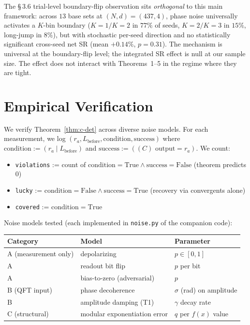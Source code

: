 \documentclass[11pt]{article}
\begin{document}
The \S\,3.6 trial-level boundary-flip observation sits \emph{orthogonal} to this main framework: across $13$ base sets at $(N, d) = (437, 4)$, phase noise universally activates a $K$-bin boundary ($K{=}1/K{=}2$ in $77\%$ of seeds, $K{=}2/K{=}3$ in $15\%$, long-jump in $8\%$), but with stochastic per-seed direction and no statistically significant cross-seed net SR (mean $+0.14\%$, $p{=}0.31$). The mechanism is universal at the boundary-flip level; the integrated SR effect is null at our sample size. The effect does not interact with Theorems~1--5 in the regime where they are tight.

\section{Empirical Verification}
\label{sec:empirical}

We verify Theorem~\ref{thm:c-det} across diverse noise models. For each measurement, we log $(r_a, L_{\mathrm{before}}, \mathrm{condition}, \mathrm{success})$ where $\mathrm{condition} := (r_a \mid L_{\mathrm{before}})$ and $\mathrm{success} := ((C) \text{ output} = r_a)$. We count:
\begin{itemize}
  \item \texttt{violations} := count of $\mathrm{condition} = \text{True} \land \mathrm{success} = \text{False}$ (theorem predicts $0$)
  \item \texttt{lucky} := $\mathrm{condition} = \text{False} \land \mathrm{success} = \text{True}$ (recovery via convergents alone)
  \item \texttt{covered} := $\mathrm{condition} = \text{True}$
\end{itemize}

Noise models tested (each implemented in \texttt{noise.py} of the companion code):

\begin{center}
\begin{tabular}{lll}
\toprule
Category & Model & Parameter \\
\midrule
A (measurement only) & depolarizing & $p \in [0, 1]$ \\
A & readout bit flip & $p$ per bit \\
A & bias-to-zero (adversarial) & $p$ \\
B (QFT input) & phase decoherence & $\sigma$ (rad) on amplitude \\
B & amplitude damping (T1) & $\gamma$ decay rate \\
C (structural) & modular exponentiation error & $q$ per $f(x)$ value \\
\bottomrule
\end{tabular}
\end{center}
\end{document}
